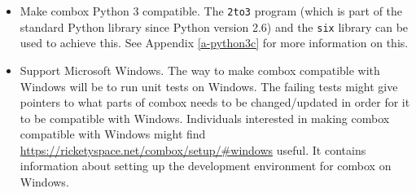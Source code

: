\begin{itemize}
\item Make combox Python 3 compatible. The \verb+2to3+ program (which
  is part of the standard Python library since Python version 2.6) and
  the \verb+six+ library can be used to achieve this. See Appendix
  \ref{a-python3c} for more information on this.

\item Support Microsoft Windows. The way to make combox compatible
  with Windows will be to run unit tests on Windows. The failing tests
  might give pointers to what parts of combox needs to be
  changed/updated in order for it to be compatible with
  Windows. Individuals interested in making combox compatible with
  Windows might find
  \url{https://ricketyspace.net/combox/setup/#windows} useful. It
  contains information about setting up the development environment
  for combox on Windows.
\end{itemize}

